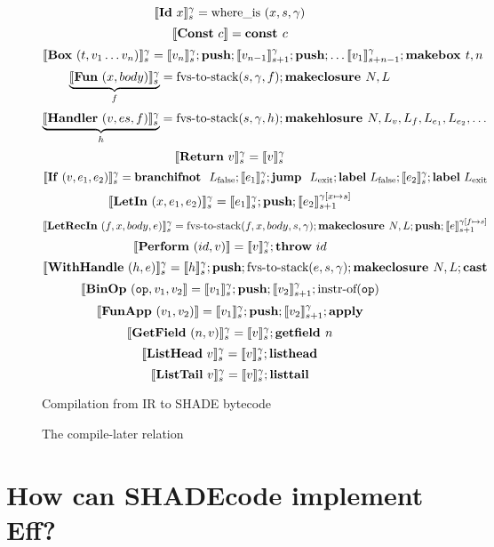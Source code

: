 \documentclass[class=article, crop=false]{standalone}
\begin{document}
\begin{figure}
    $$ \llbracket \mathbf{Id}\ x \rrbracket_s^\gamma = \text{where\_is}\ (x, s, \gamma) $$
    $$ \llbracket \mathbf{Const}\ c \rrbracket = \textbf{const } c $$
    $$ \llbracket \mathbf{Box}\ (t, v_1 \dots v_n) \rrbracket_s ^ \gamma = \llbracket v_n \rrbracket_s^\gamma; \textbf{push}; \llbracket v_{n-1} \rrbracket_{s+1}^\gamma; \textbf{push}; \dots \llbracket v_1 \rrbracket_{s+n-1}^\gamma; \textbf{makebox }t, n $$
    $$ \underbrace{\llbracket \mathbf{Fun}\ (x, body) \rrbracket_s ^\gamma }_f = \text{fvs-to-stack} (s, \gamma, f); \textbf{makeclosure }N, L $$
    $$ \underbrace{\llbracket \mathbf{Handler}\ (v, es, f) \rrbracket_s^\gamma}_h = \text{fvs-to-stack} (s, \gamma, h); \textbf{makehlosure }N, L_v, L_f, L_{e_1}, L_{e_2}, \dots $$
    $$ \llbracket \mathbf{Return}\ v \rrbracket_s ^ \gamma =  \llbracket v \rrbracket_s ^ \gamma $$
    $$ \llbracket \mathbf{If}\ (v, e_1, e_2) \rrbracket_s ^ \gamma = \textbf{branchifnot }\ L_\text{false}; \llbracket e_1 \rrbracket_s^\gamma; \textbf{jump }\ L_\text{exit}; \textbf{label}\ L_\text{false}; \llbracket e_2 \rrbracket_s^\gamma; \textbf{label}\ L_\text{exit} $$
    $$ \llbracket \mathbf{LetIn}\ (x, e_1, e_2) \rrbracket_s^\gamma = \llbracket e_1 \rrbracket_s^\gamma; \textbf{push}; \llbracket e_2 \rrbracket_{s+1}^{\gamma[x \mapsto s]} $$
    $$ \llbracket \mathbf{LetRecIn}\ (f, x, body, e) \rrbracket_s^\gamma = \text{fvs-to-stack}(f, x, body, s, \gamma); \textbf{makeclosure }N, L; \textbf{push}; \llbracket e \rrbracket_{s+1}^{\gamma[f \mapsto s]} $$
    $$ \llbracket \mathbf{Perform}\ (id, v) \rrbracket = \llbracket v \rrbracket_s ^ \gamma; \textbf{throw}\ id $$
    $$ \llbracket \mathbf{WithHandle}\ (h, e) \rrbracket_s ^ \gamma = \llbracket h \rrbracket_s ^ \gamma; \textbf{push}; \text{fvs-to-stack}(e, s, \gamma); \textbf{makeclosure }N, L; \mathbf{cast} $$
    $$ \llbracket \mathbf{BinOp}\ (\mathtt{op}, v_1, v_2 \rrbracket = \llbracket v_1 \rrbracket_s ^ \gamma; \textbf{push}; \llbracket v_2 \rrbracket_{s+1}^\gamma; \text{instr-of}(\mathtt{op}) $$
    $$ \llbracket \mathbf{FunApp}\ (v_1, v_2) \rrbracket = \llbracket v_1 \rrbracket_s ^ \gamma; \textbf{push}; \llbracket v_2 \rrbracket_{s+1} ^ \gamma; \textbf{apply} $$
    $$ \llbracket \mathbf{GetField}\ (n, v) \rrbracket_s ^ \gamma = \llbracket v \rrbracket_s ^ \gamma; \textbf{getfield }n $$
    $$ \llbracket \mathbf{ListHead}\ v \rrbracket_s ^ \gamma = \llbracket v \rrbracket_s ^ \gamma; \textbf{listhead} $$
    $$ \llbracket \mathbf{ListTail}\ v \rrbracket_s ^ \gamma = \llbracket v \rrbracket_s ^ \gamma ; \textbf{listtail} $$

    \caption{Compilation from IR to SHADE bytecode}
    \label{fig:compilation}
\end{figure}

\begin{figure}


    \caption{The compile-later relation}
    \label{compile-later}
\end{figure}

\section{How can SHADEcode implement Eff?}
\end{document}
